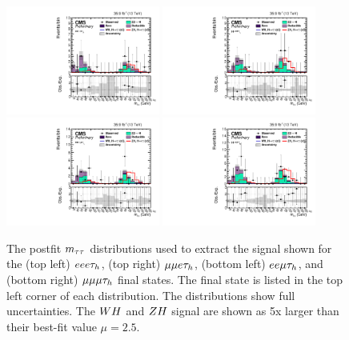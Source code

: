 \begin{figure}[h!]
 \begin{center}
  \includegraphics[width=0.45\textwidth]{higgs_to_taus_vh/plots/zh/eeet_postfit.pdf}
  \includegraphics[width=0.45\textwidth]{higgs_to_taus_vh/plots/zh/emmt_postfit.pdf}
  \includegraphics[width=0.45\textwidth]{higgs_to_taus_vh/plots/zh/eemt_postfit.pdf}
  \includegraphics[width=0.45\textwidth]{higgs_to_taus_vh/plots/zh/mmmt_postfit.pdf}
 \end{center}
 \caption{The postfit $m_{\tau\tau}$ distributions used to extract the signal shown
  for the (top left) $eee\tau_{h}$, (top right) $\mu\mu e\tau_{h}$, 
  (bottom left) $ee\mu\tau_{h}$, and (bottom right) $\mu\mu\mu\tau_{h}$
  final states. The final state is listed in the
  top left corner of each distribution.
  The distributions show full uncertainties.
  The $WH$ and $ZH$ signal are shown as 5x larger than their best-fit
  value $\mu = 2.5$.
 }
 \label{fig:zh_all_eight1}
\end{figure}

